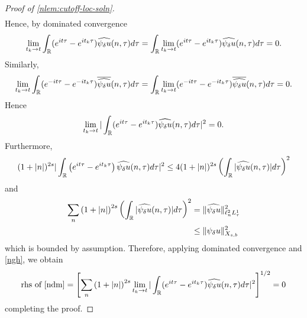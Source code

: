 \begin{proof}[Proof of \cref{nlem:cutoff-loc-soln}]
\begin{equation*}
\begin{split}
\end{split}
\end{equation*}
%
%
Hence, by dominated convergence
%
%
\begin{equation*}
\begin{split}
\lim_{t_{k} \to t}  \int_{\mathbb{R}} (e^{it \tau} - e^{it_{k} \tau})
    \widehat{\psi_{\delta} u}(n,
    \tau) d \tau =  \int_{\mathbb{R}} \lim_{t_{k} \to t} (e^{it \tau} - e^{it_{k} \tau})
    \widehat{\psi_{\delta} u}(n,
    \tau) d \tau = 0. 
\end{split}
\end{equation*}
%
%
Similarly, 
%
%
%
\begin{equation*}
\begin{split}
\lim_{t_{k} \to t} \int_{\mathbb{R}} (e^{-it \tau} - e^{-it_{k} \tau})
    \overline{\widehat{\psi_{\delta} u}}(n,
    \tau) d \tau  =\int_{\mathbb{R}}  \lim_{t_{k} \to t} (e^{-it \tau} - e^{-it_{k} \tau})
    \overline{\widehat{\psi_{\delta} u}}(n,
    \tau) d \tau  = 0.
\end{split}
\end{equation*}
%
%
Hence
%
%
%
\begin{equation}
  \label{ngh}
\begin{split}
  \lim_{t_{k} \to t} | \int_{\mathbb{R}} (e^{it \tau} - e^{it_{k} \tau})
    \widehat{\psi_{\delta} u}(n,
		\tau) d \tau |^2 = 0.
\end{split}
\end{equation}
%
%
		Furthermore,
    \begin{equation*}
    \begin{split}
      (1 + | n |)^{2s} | \int_{\mathbb{R}} \left( e^{it\tau} - e^{it_{k} \tau} \right)
      \widehat{\psi_{\delta}u}(n, \tau) d \tau|^{2} \le 4 (1 + | n |)^{2s} \left(
      \int_{\mathbb{R}} | \widehat{\psi_{\delta} u}(n, \tau)  | d \tau
      \right)^{2}
    \end{split}
    \end{equation*}
    and
		\begin{equation*}
			\begin{split}
         \sum_{n}  \left( 1 + | n |
        \right)^{2s} \left ( \int_{\mathbb{R}} |\widehat{\psi_{\delta} u}(n, \tau)| d \tau
        \right )^2  
        & = \|\widehat{\psi_{\delta} u}\|_{\ell^{2}_{n}L^{1}_{\tau}}^2
		\\
		& \le \|\psi_{\delta} u \|_{X_{s,b}}^2 
	\end{split}
\end{equation*}
which is bounded by assumption. Therefore, applying dominated convergence and
\eqref{ngh}, we
obtain 
%
%
\begin{equation*}
\begin{split}
  \text{rhs of \eqref{ndm}} = \left[ \sum_{n} \left( 1 + | n |
    \right)^{2s} \lim_{t_{k} \to t} | \int_{\mathbb{R}} (e^{it \tau} - e^{it_{k} \tau})
    \widehat{\psi_{\delta} u}(n,
		\tau) d \tau |^2 \right]^{1/2} = 0
\end{split}
\end{equation*}
%
%
completing the proof. 
\end{proof}
